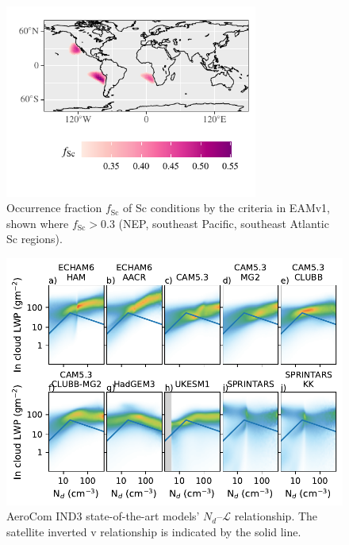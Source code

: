 \documentclass[acp, manuscript]{copernicus}\usepackage[]{graphicx}\usepackage[]{xcolor}
\newenvironment{knitrout}{}{} %
\newcommand\nd{\ensuremath{N_d}}
\newcommand\lwp{\ensuremath{\mathcal L}}
\begin{document}
\begin{figure}
  \centering
\begin{knitrout}
\color{fgcolor}

{\centering \includegraphics[width=8.3cm]{figure/fscu-1} 

}


\end{knitrout}
  \caption{Occurrence fraction $f_\text{Sc}$ of Sc conditions by the \citet{Medeiros2011}
    criteria in EAMv1, shown where $f_\text{Sc} > 0.3$ (NEP, southeast
    Pacific, southeast Atlantic Sc regions).}
  \label{fig:fscu}
\end{figure}
%
\clearpage
%
\begin{figure}[t]
  \centering
  \includegraphics[width=12cm]{figure/aerocom.pdf}
  \caption{AeroCom IND3 state-of-the-art models' \nd--\lwp{} relationship.
    The satellite inverted v relationship \citep{Gryspeerdt2019} is
    indicated by the solid line.}
  \label{fig:ind3}
\end{figure}
%
\clearpage
%
\end{document}
